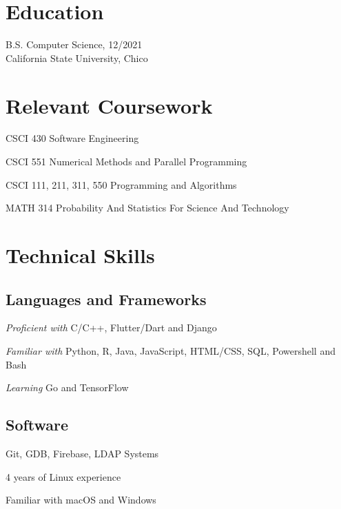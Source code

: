 \documentclass[letterpaper]{article}
\renewenvironment{itemize}{
  \begin{list}{}{
    \setlength{\leftmargin}{1.5em}
  }
}{
  \end{list}
}
\begin{document}
\begin{minipage}[t]{0.475\linewidth}
    \section*{Education}
    \begin{itemize}
    \item[$\bullet$] B.S. Computer Science, 12/2021 \\
        California State University, Chico
    \end{itemize}
    \section*{Relevant Coursework}
    \begin{itemize}
        \item[$\bullet$] CSCI 430 Software Engineering
        \item[$\bullet$] CSCI 551 Numerical Methods and Parallel Programming
        \item[$\bullet$] CSCI 111, 211, 311, 550 Programming and Algorithms
        \item[$\bullet$] MATH 314 Probability And Statistics For Science And Technology
    \end{itemize}
\end{minipage}
\hspace{0.5cm}
\begin{minipage}[t]{0.475\linewidth}
    \section*{Technical Skills}
    \subsection*{Languages and Frameworks}
    \begin{itemize}
        \item[$\bullet$] \emph{Proficient with} C/C++, Flutter/Dart and Django
        \item[$\bullet$] \emph{Familiar with} Python, R, Java, JavaScript,  HTML/CSS, SQL, Powershell and Bash
        \item[$\bullet$] \emph{Learning} Go and TensorFlow
    \end{itemize}
    \subsection*{Software}
    \begin{itemize}
        \item[$\bullet$] Git, GDB, Firebase, LDAP Systems
        \item[$\bullet$] 4 years of Linux experience
        \item[$\bullet$] Familiar with macOS and Windows
    \end{itemize}
\end{minipage}
\end{document}
